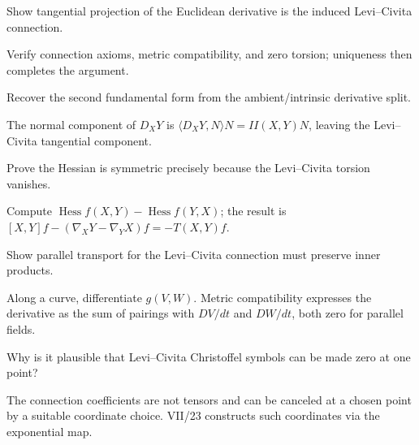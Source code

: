 \begin{problem}\label{prob:vii22-07}
Show tangential projection of the Euclidean derivative is the induced Levi--Civita connection.
\end{problem}
\begin{solution}
Verify connection axioms, metric compatibility, and zero torsion; uniqueness then completes the argument.
\end{solution}


\begin{problem}\label{prob:vii22-08}
Recover the second fundamental form from the ambient/intrinsic derivative split.
\end{problem}
\begin{solution}
The normal component of \(D_XY\) is \(\langle D_XY,N\rangle N=II(X,Y)N\), leaving the Levi--Civita tangential component.
\end{solution}


\begin{problem}\label{prob:vii22-09}
Prove the Hessian is symmetric precisely because the Levi--Civita torsion vanishes.
\end{problem}
\begin{solution}
Compute \(\operatorname{Hess}f(X,Y)-\operatorname{Hess}f(Y,X)\); the result is \([X,Y]f-(\nabla_XY-\nabla_YX)f=-T(X,Y)f\).
\end{solution}


\begin{problem}\label{prob:vii22-10}
Show parallel transport for the Levi--Civita connection must preserve inner products.
\end{problem}
\begin{solution}
Along a curve, differentiate \(g(V,W)\). Metric compatibility expresses the derivative as the sum of pairings with \(DV/dt\) and \(DW/dt\), both zero for parallel fields.
\end{solution}


\begin{problem}\label{prob:vii22-11}
Why is it plausible that Levi--Civita Christoffel symbols can be made zero at one point?
\end{problem}
\begin{solution}
The connection coefficients are not tensors and can be canceled at a chosen point by a suitable coordinate choice. VII/23 constructs such coordinates via the exponential map.
\end{solution}



